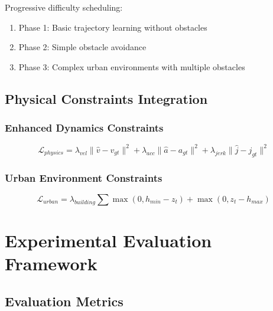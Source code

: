 \documentclass[12pt]{article}
\begin{document}
Progressive difficulty scheduling:

\begin{enumerate}
    \item Phase 1: Basic trajectory learning without obstacles
    \item Phase 2: Simple obstacle avoidance
    \item Phase 3: Complex urban environments with multiple obstacles
\end{enumerate}

\subsection{Physical Constraints Integration}

\subsubsection{Enhanced Dynamics Constraints}

\begin{equation}
\mathcal{L}_{physics} = \lambda_{vel} \| \hat{v} - v_{gt} \|^2 + \lambda_{acc} \| \hat{a} - a_{gt} \|^2 + \lambda_{jerk} \| \hat{j} - j_{gt} \|^2
\end{equation}

\subsubsection{Urban Environment Constraints}

\begin{equation}
\mathcal{L}_{urban} = \lambda_{building} \sum \max(0, h_{min} - z_t) + \max(0, z_t - h_{max})
\end{equation}

\section{Experimental Evaluation Framework}

\subsection{Evaluation Metrics}
\end{document}

